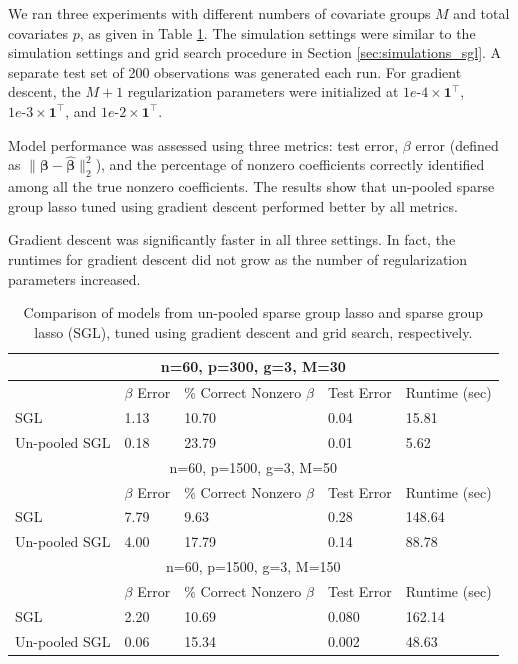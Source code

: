 \documentclass{statsoc}
\begin{document}
We ran three experiments with different numbers of covariate groups $M$ and total covariates $p$, as given in Table \ref{table:unpooled}. The simulation settings were similar to the simulation settings and grid search procedure in Section \ref{sec:simulations_sgl}. A separate test set of 200 observations was generated each run. For gradient descent, the $M+1$ regularization parameters were initialized at $1e\text{-}4 \times \boldsymbol 1^\top$, $1e\text{-}3 \times \boldsymbol 1^\top$, and $1e\text{-}2 \times \boldsymbol 1^\top$.

Model performance was assessed using three metrics: test error, $\beta$ error (defined as $\| \boldsymbol \beta - \hat {\boldsymbol \beta} \|_2 ^2$), and the percentage of nonzero coefficients correctly identified among all the true nonzero coefficients. The results show that un-pooled sparse group lasso tuned using gradient descent performed better by all metrics.

Gradient descent was significantly faster in all three settings. In fact, the runtimes for gradient descent did not grow as the number of regularization parameters increased.

\begin{table}
\caption{\label{table:unpooled} Comparison of models from un-pooled sparse group lasso and sparse group lasso (SGL), tuned using gradient descent and grid search, respectively.}
\centering
\begin{tabular}{| l | l | l | l | l | }
\hline
\multicolumn{5}{|c|}{n=60, p=300, g=3, M=30}\\
\hline
 & $\beta$ Error & \% Correct Nonzero $\beta$ & Test Error & Runtime (sec) \\
\hline
SGL & 1.13 & 10.70 & 0.04 & 15.81 \\
\hline
Un-pooled SGL & 0.18 & 23.79 & 0.01 & 5.62 \\
\hline
\multicolumn{5}{|c|}{n=60, p=1500, g=3, M=50}\\
\hline
 & $\beta$ Error & \% Correct Nonzero $\beta$ & Test Error & Runtime (sec) \\
\hline
SGL & 7.79 & 9.63 & 0.28 & 148.64 \\
\hline
Un-pooled SGL & 4.00 & 17.79 & 0.14 & 88.78 \\
\hline
\multicolumn{5}{|c|}{n=60, p=1500, g=3, M=150}\\
\hline
 & $\beta$ Error & \% Correct Nonzero $\beta$ & Test Error & Runtime (sec) \\
\hline
SGL & 2.20 & 10.69 & 0.080 & 162.14 \\
\hline
Un-pooled SGL & 0.06 & 15.34 & 0.002 & 48.63 \\
\hline
\end{tabular}
\end{table}
\end{document}
